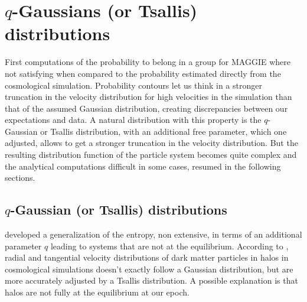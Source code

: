 \chapter{$q$-Gaussians (or Tsallis) distributions}
\label{cha:q_gaussians_or_tsallis_distributions}
\minitoc%

First computations of the probability to belong in a group for MAGGIE where
not satisfying when compared to the probability estimated directly from the
cosmological simulation. Probability contours let us think in a stronger
truncation in the velocity distribution for high velocities in the
simulation than that of the assumed Gaussian distribution, creating
discrepancies between our expectations and data. A natural distribution with
this property is the $q$-Gaussian or Tsallis distribution, with an
additional free parameter, which one adjusted, allows to get a stronger
truncation in the velocity distribution. But the resulting distribution
function of the particle system becomes quite complex and the analytical
computations difficult in some cases, resumed in the following sections.

\section{$q$-Gaussian (or Tsallis) distributions}
\label{sec:q_gaussian_or_tsallis_distributions}

\citet{Tsallis+88} developed a generalization of the entropy, non extensive,
in terms of an additional parameter $q$ leading to systems that are not at
the equilibrium. According to \citet{Hansen+06}, radial and tangential
velocity distributions of dark matter particles in halos in cosmological
simulations doesn't exactly follow a Gaussian distribution, but are more
accurately adjusted by a Tsallis distribution. A possible explanation is
that halos are not fully at the equilibrium at our epoch.

